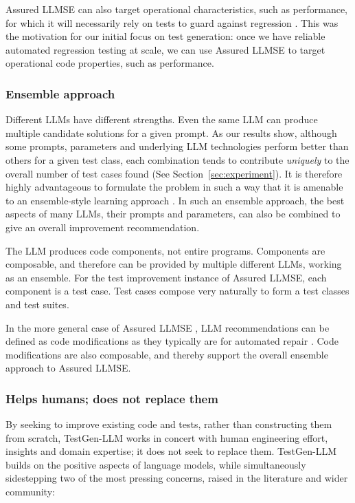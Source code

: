\documentclass[sigconf,screen]{acmart}
\begin{document}
Assured LLMSE can also target operational characteristics, such as performance, for which it will necessarily rely on tests to guard against regression \cite{mhetal:intense24-keynote}. 
This was the motivation for our initial  focus on test generation: once we have reliable automated regression testing at scale, we can use Assured LLMSE to target operational code properties, such as performance.


\subsubsection{Ensemble approach}
Different LLMs have different strengths. 
Even the same LLM can produce multiple candidate solutions for a given prompt. 
As our results show, although some prompts, parameters and underlying LLM technologies perform better than others for a given test class, 
each combination tends to contribute {\em uniquely} to the overall number of test cases found (See Section~\ref{sec:experiment}).
It is therefore highly advantageous to formulate the problem in such a way that it is amenable to an ensemble-style learning approach \cite{dong:ensemble-survey}. 
In such an ensemble approach, the best aspects of many LLMs, their prompts and parameters, can also be combined to give an overall improvement recommendation. 

The LLM produces code components, not entire programs. 
Components are composable, and therefore can be provided by multiple different LLMs, working as an ensemble. 
For the test improvement instance of Assured LLMSE, each component is a test case.
Test cases compose very naturally to form a test classes and test suites.  

In the more general case of Assured LLMSE \cite{mhetal:intense24-keynote}, LLM recommendations can be defined as code modifications
as they typically are for automated repair \cite{legoues:cacm-survey,legoues:genprog-sqj,huang:repair-survey,Repairnator,ametal:sapfix}. 
Code modifications are also composable, and thereby support the overall ensemble approach to Assured LLMSE.





\subsubsection{Helps humans; does not replace them} 
By seeking to improve existing code and tests, rather than constructing them from scratch, TestGen-LLM  works in concert with human engineering effort, insights and domain expertise; it does not seek to replace them.
TestGen-LLM builds on the positive aspects of language models, while simultaneously sidestepping two of the most pressing concerns, raised in the literature and wider community: 
\end{document}
